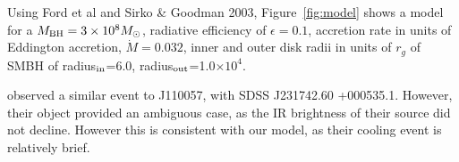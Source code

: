 \documentclass{nature}
\begin{document}
Using Ford et al and Sirko \& Goodman 2003, Figure~\ref{fig:model}
shows a model for a $M_{\rm BH}=3\times 10^{8} M_{\odot}$, radiative
efficiency of $\epsilon=0.1$, accretion rate in units of Eddington
accretion, $\dot{M}=0.032$, inner and outer disk radii in units of
$r_g$ of SMBH of radius$_{\rm in}$=6.0, radius$_{\rm out}$=1.0$\times
10^{4}$.

\cite{Guo16} observed a similar event to J110057, with SDSS
J231742.60 +000535.1. However, their object provided an ambiguous
case, as the IR brightness of their source did not decline. However
this is consistent with our model, as their cooling event is
relatively brief.










%
\end{document}
